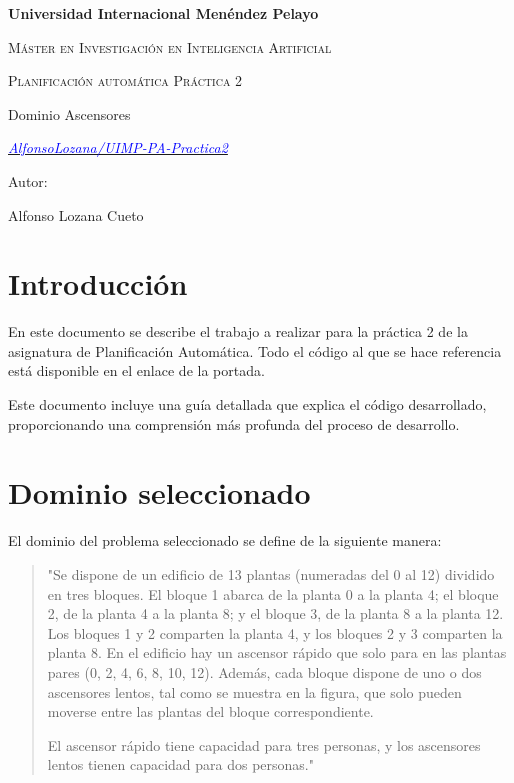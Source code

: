 \documentclass{article}
\begin{document}
\begin{titlepage}
    \centering
    {\bfseries\LARGE Universidad Internacional Menéndez Pelayo  \par}
    \vspace{1cm}
    {\scshape\Large Máster en Investigación en Inteligencia Artificial    \par}
    \vspace{3cm}
    {\scshape\Huge Planificación automática Práctica 2 \par}
    {\Large Dominio Ascensores  \par}
    \vspace{3cm}
    {\itshape\Large \href{https://github.com/AlfonsoLozana/UIMP-PA-Practica2}{\textcolor{blue}{AlfonsoLozana/UIMP-PA-Practica2}} \par} %
    \vfill
    {\Large Autor: \par}
    {\Large Alfonso Lozana Cueto \par}
    \vfill
\end{titlepage}

\section{Introducción}
En este documento se describe el trabajo a realizar para la práctica 2 de la asignatura de Planificación Automática. Todo el código al que se hace referencia está disponible en el enlace de la portada.

Este documento incluye una guía detallada que explica el código desarrollado, proporcionando una comprensión más profunda del proceso de desarrollo.

\section{Dominio seleccionado}
El dominio del problema seleccionado se define de la siguiente manera:

\begin{quotation}
"Se dispone de un edificio de 13 plantas (numeradas del 0 al 12) dividido en tres bloques. El bloque 1 abarca de la planta 0 a la planta 4; el bloque 2, de la planta 4 a la planta 8; y el bloque 3, de la planta 8 a la planta 12. Los bloques 1 y 2 comparten la planta 4, y los bloques 2 y 3 comparten la planta 8. En el edificio hay un ascensor rápido que solo para en las plantas pares (0, 2, 4, 6, 8, 10, 12). Además, cada bloque dispone de uno o dos ascensores lentos, tal como se muestra en la figura, que solo pueden moverse entre las plantas del bloque correspondiente.

El ascensor rápido tiene capacidad para tres personas, y los ascensores lentos tienen capacidad para dos personas."
\end{quotation}
\end{document}
